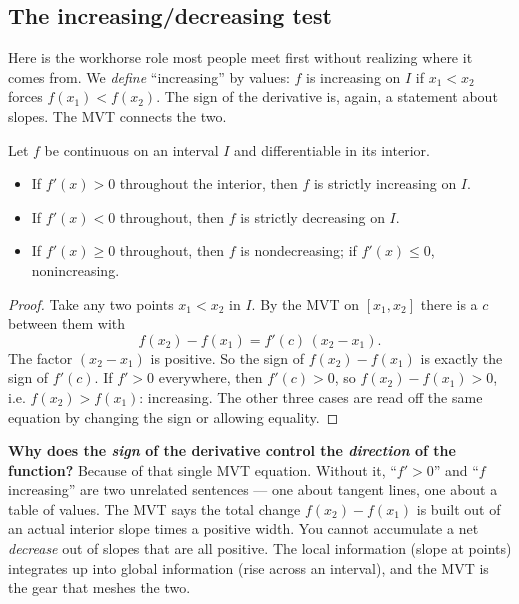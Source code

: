 \subsection{The increasing/decreasing test}

Here is the workhorse role most people meet first without realizing where it comes
from. We \emph{define} ``increasing'' by values: $f$ is increasing on $I$ if
$x_1<x_2$ forces $f(x_1)<f(x_2)$. The sign of the derivative is, again, a statement
about slopes. The MVT connects the two.

\begin{theorem}\label{ch15:thm-mono}
Let $f$ be continuous on an interval $I$ and differentiable in its interior.
\begin{itemize}
\item If $f'(x)>0$ throughout the interior, then $f$ is strictly increasing on $I$.
\item If $f'(x)<0$ throughout, then $f$ is strictly decreasing on $I$.
\item If $f'(x)\ge 0$ throughout, then $f$ is nondecreasing; if $f'(x)\le 0$,
nonincreasing.
\end{itemize}
\end{theorem}

\begin{proof}
Take any two points $x_1<x_2$ in $I$. By the MVT on $[x_1,x_2]$ there is a $c$
between them with
\[
  f(x_2)-f(x_1)=f'(c)\,(x_2-x_1).
\]
The factor $(x_2-x_1)$ is positive. So the sign of $f(x_2)-f(x_1)$ is exactly the
sign of $f'(c)$. If $f'>0$ everywhere, then $f'(c)>0$, so $f(x_2)-f(x_1)>0$, i.e.
$f(x_2)>f(x_1)$: increasing. The other three cases are read off the same equation by
changing the sign or allowing equality.
\end{proof}

\begin{whybox}
\textbf{Why does the \emph{sign} of the derivative control the \emph{direction} of
the function?} Because of that single MVT equation. Without it, ``$f'>0$'' and
``$f$ increasing'' are two unrelated sentences --- one about tangent lines, one
about a table of values. The MVT says the total change $f(x_2)-f(x_1)$ is built out
of an actual interior slope times a positive width. You cannot accumulate a net
\emph{decrease} out of slopes that are all positive. The local information (slope at
points) integrates up into global information (rise across an interval), and the MVT
is the gear that meshes the two.
\end{whybox}


